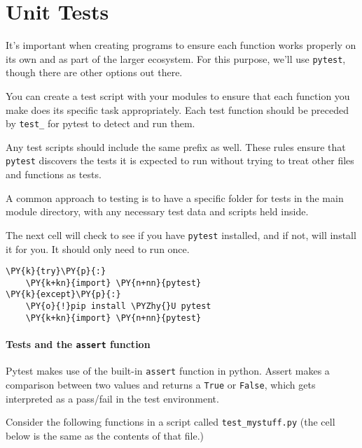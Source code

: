\section{Unit Tests}
It's important when creating programs to ensure each function works
properly on its own and as part of the larger ecosystem. For this
purpose, we'll use \texttt{pytest}, though there are other options out
there.

You can create a test script with your modules to ensure that each
function you make does its specific task appropriately. Each test
function should be preceded by \texttt{test\_} for pytest to detect and
run them.

Any test scripts should include the same prefix as well. These rules
ensure that \texttt{pytest} discovers the tests it is expected to run
without trying to treat other files and functions as tests.

A common approach to testing is to have a specific folder for tests in
the main module directory, with any necessary test data and scripts held
inside.

The next cell will check to see if you have \texttt{pytest} installed,
and if not, will install it for you. It should only need to run once.

    \begin{tcolorbox}[breakable, size=fbox, boxrule=1pt, pad at break*=1mm,colback=cellbackground, colframe=cellborder]
\begin{Verbatim}[commandchars=\\\{\}]
\PY{k}{try}\PY{p}{:}
    \PY{k+kn}{import} \PY{n+nn}{pytest}
\PY{k}{except}\PY{p}{:}
    \PY{o}{!}pip install \PYZhy{}U pytest
    \PY{k+kn}{import} \PY{n+nn}{pytest}
\end{Verbatim}
\end{tcolorbox}

    \hypertarget{tests-and-the-assert-function}{%
\paragraph{\texorpdfstring{Tests and the \texttt{assert}
function}{Tests and the assert function}}\label{tests-and-the-assert-function}}

Pytest makes use of the built-in \texttt{assert} function in python.
Assert makes a comparison between two values and returns a \texttt{True}
or \texttt{False}, which gets interpreted as a pass/fail in the test
environment.

Consider the following functions in a script called
\texttt{test\_mystuff.py} (the cell below is the same as the contents of
that file.)

